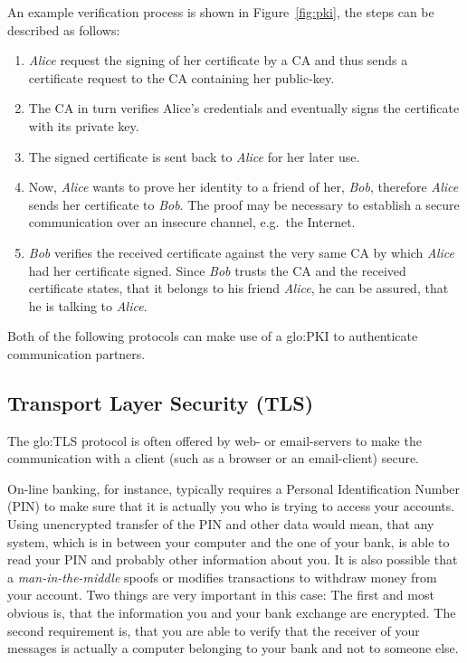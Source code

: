 An  example verification  process  is shown  in Figure~\ref{fig:pki},  the
steps can be described as follows:
\begin{enumerate}
\item \emph{Alice} request the signing of her certificate by a CA and thus
  sends a certificate request to the CA containing her public-key.
\item The CA in turn verifies Alice's credentials and eventually signs the
  certificate with its private key.
\item The signed certificate is sent back to \emph{Alice} for her later use.
\item Now,  \emph{Alice} wants to prove  her identity to a  friend of her,
  \emph{Bob},   therefore   \emph{Alice}    sends   her   certificate   to
  \emph{Bob}.  The   proof  may  be   necessary  to  establish   a  secure
  communication over an insecure channel, e.g.~the Internet.
\item \emph{Bob}  verifies the received certificate against  the very same
  CA by  which \emph{Alice} had her certificate  signed.  Since \emph{Bob}
  trusts the  CA and the received  certificate states, that  it belongs to
  his  friend \emph{Alice},  he  can be  assured,  that he  is talking  to
  \emph{Alice}.
\end{enumerate}

\bigskip

Both  of  the following  protocols  can make  use  of  a \gls{glo:PKI}  to
authenticate communication partners.

\subsection[Transport Layer Security]{Transport Layer Security (TLS)}

The \gls{glo:TLS}  protocol is often  offered by web- or  email-servers to
make  the  communication   with  a  client  (such  as   a  browser  or  an
email-client) secure.

On-line   banking,   for   instance,   typically   requires   a   Personal
Identification Number  (PIN) to make sure  that it is actually  you who is
trying to access your accounts.  Using unencrypted transfer of the PIN and
other data would mean, that any  system, which is in between your computer
and the  one of your  bank, is  able to read  your PIN and  probably other
information about you. It is also possible that a \emph{man-in-the-middle}
spoofs or modifies  transactions to withdraw money from  your account. Two
things are  very important in  this case: The  first and most  obvious is,
that the information you and  your bank exchange are encrypted. The second
requirement is,  that you  are able  to verify that  the receiver  of your
messages is actually a computer belonging  to your bank and not to someone
else.

